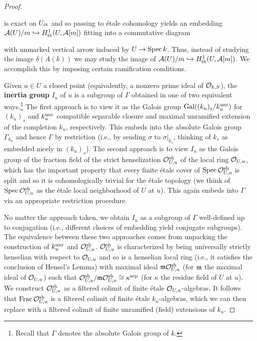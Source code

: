 \documentclass[11pt]{article}
\begin{document}
\begin{proof}
\begin{center}
\end{center}
is exact on $U_{\operatorname{\acute{e}t}}$ and so passing to \'{e}tale cohomology yields an embedding $\mathcal{A}(U)/m\hookrightarrow H_{\operatorname{\acute{e}t}}^1(U,\mathcal{A}[m])$ fitting into a commutative diagram
\begin{center}
\end{center}
with unmarked vertical arrow induced by $U\to\operatorname{Spec} k$. Thus, instead of studying the image $\delta(A(k))$ we may study the image of $\mathcal{A}(U)/m\hookrightarrow H_{\operatorname{\acute{e}t}}^1(U,\mathcal{A}[m])$. We accomplish this by imposing certain ramification conditions. 

Given $u\in U$ a closed point (equivalently, a nonzero prime ideal of $\mathcal{O}_{k,S}$), the \textbf{inertia group} $I_u$ of $u$ is a subgroup of $\Gamma$ obtained in one of two equivalent ways.\footnote{Recall that $\Gamma$ denotes the absolute Galois group of $k$.} The first approach is to view it as the Galois group $\operatorname{Gal}((k_u)_s/k_u^{\operatorname{unr}})$ for $(k_u)_s$ and $k_u^{\operatorname{unr}}$ compatible separable closure and maximal unramified extension of the completion $k_u$, respectively. This embeds into the absolute Galois group $\Gamma_{k_u}$ and hence $\Gamma$ by restriction (i.e., by sending $\sigma$ to $\sigma|_{k_s}$, thinking of $k_s$ as embedded nicely in $(k_u)_s$). The second approach is to view $I_u$ as the Galois group of the fraction field of the strict henselization $\mathcal{O}_{U,u}^{\operatorname{sh}}$ of the local ring $\mathcal{O}_{U,u}$, which has the important property that every finite \'{e}tale cover of $\operatorname{Spec}\mathcal{O}_{U,u}^{\operatorname{sh}}$ is split and so it is cohomologically trivial for the \'{e}tale topology (we think of $\operatorname{Spec}\mathcal{O}_{U,u}^{\operatorname{sh}}$ as the \'{e}tale local neighborhood of $U$ at $u$). This again embeds into $\Gamma$ via an appropriate restriction procedure. 

No matter the approach taken, we obtain $I_u$ as a subgroup of $\Gamma$ well-defined up to conjugation (i.e., different choices of embedding yield conjugate subgroups). The equivalence between these two approaches comes from unpacking the construction of $k_u^{\operatorname{unr}}$ and $\mathcal{O}_{U,u}^{\operatorname{sh}}$. $\mathcal{O}_{U,u}^{\operatorname{sh}}$ is characterized by being universally strictly henselian with respect to $\mathcal{O}_{U,u}$ and so is a henselian local ring (i.e., it satisfies the conclusion of Hensel's Lemma) with maximal ideal $\mathfrak{m}\mathcal{O}_{U,u}^{\operatorname{sh}}$ (for $\mathfrak{m}$ the maximal ideal of $\mathcal{O}_{U,u}$) such that $\mathcal{O}_{U,u}^{\operatorname{sh}}/\mathfrak{m}\mathcal{O}_{U,u}^{\operatorname{sh}}\cong\kappa^{\operatorname{sep}}$ (for $\kappa$ the residue field of $U$ at $u$). We construct $\mathcal{O}_{U,u}^{\operatorname{sh}}$ as a filtered colimit of finite \'{e}tale $\mathcal{O}_{U,u}$-algebras. It follows that $\operatorname{Frac}\mathcal{O}_{U,u}^{\operatorname{sh}}$ is a filtered colimit of finite \'{e}tale $k_u$-algebras, which we can then replace with a filtered colimit of finite unramified (field) extensions of $k_u$.


\end{proof}
\end{document}
